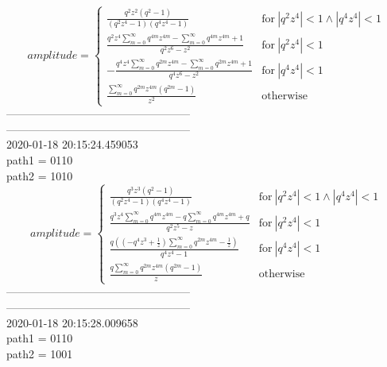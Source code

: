$$amplitude = \begin{cases} \frac{q^{2} z^{2} \left(q^{2} - 1\right)}{\left(q^{2} z^{4} - 1\right) \left(q^{4} z^{4} - 1\right)} & \text{for}\: \left|{q^{2} z^{4}}\right| < 1 \wedge \left|{q^{4} z^{4}}\right| < 1 \\\frac{q^{2} z^{4} \sum_{m=0}^{\infty} q^{4 m} z^{4 m} - \sum_{m=0}^{\infty} q^{4 m} z^{4 m} + 1}{q^{2} z^{6} - z^{2}} & \text{for}\: \left|{q^{2} z^{4}}\right| < 1 \\- \frac{q^{4} z^{4} \sum_{m=0}^{\infty} q^{2 m} z^{4 m} - \sum_{m=0}^{\infty} q^{2 m} z^{4 m} + 1}{q^{4} z^{6} - z^{2}} & \text{for}\: \left|{q^{4} z^{4}}\right| < 1 \\\frac{\sum_{m=0}^{\infty} q^{2 m} z^{4 m} \left(q^{2 m} - 1\right)}{z^{2}} & \text{otherwise} \end{cases}$$
--------------------------------------------------\\
--------------------------------------------------\\
2020-01-18 20:15:24.459053\\
path1 = 0110\\
path2 = 1010\\
$$amplitude = \begin{cases} \frac{q^{3} z^{3} \left(q^{2} - 1\right)}{\left(q^{2} z^{4} - 1\right) \left(q^{4} z^{4} - 1\right)} & \text{for}\: \left|{q^{2} z^{4}}\right| < 1 \wedge \left|{q^{4} z^{4}}\right| < 1 \\\frac{q^{3} z^{4} \sum_{m=0}^{\infty} q^{4 m} z^{4 m} - q \sum_{m=0}^{\infty} q^{4 m} z^{4 m} + q}{q^{2} z^{5} - z} & \text{for}\: \left|{q^{2} z^{4}}\right| < 1 \\\frac{q \left(\left(- q^{4} z^{3} + \frac{1}{z}\right) \sum_{m=0}^{\infty} q^{2 m} z^{4 m} - \frac{1}{z}\right)}{q^{4} z^{4} - 1} & \text{for}\: \left|{q^{4} z^{4}}\right| < 1 \\\frac{q \sum_{m=0}^{\infty} q^{2 m} z^{4 m} \left(q^{2 m} - 1\right)}{z} & \text{otherwise} \end{cases}$$
--------------------------------------------------\\
--------------------------------------------------\\
2020-01-18 20:15:28.009658\\
path1 = 0110\\
path2 = 1001\\
